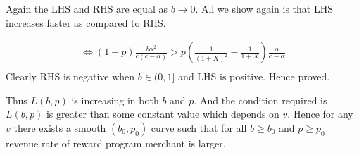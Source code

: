 {Again the LHS and RHS are equal as $b\rightarrow 0$. All we show again is that LHS increases faster as compared to RHS.

\begin{align*}
\Leftrightarrow (1-p)\frac{b\alpha^2}{e(e-\alpha)} > p\left(\frac{1}{(1+X)^2} - \frac{1}{1+X} \right)\frac{\alpha}{e-\alpha}\\
\end{align*}
Clearly RHS is negative when $b\in (0,1]$ and LHS is positive. Hence proved.

Thus $L(b,p)$ is increasing in both $b$ and $p$. And the condition required is $L(b,p)$ is greater than some constant value which depends on $v$.
Hence for any $v$ there exists a smooth $(b_0,p_0)$ curve such that for all $b\ge b_0$ and $p\ge p_0$ revenue rate of reward program merchant is larger.
}


